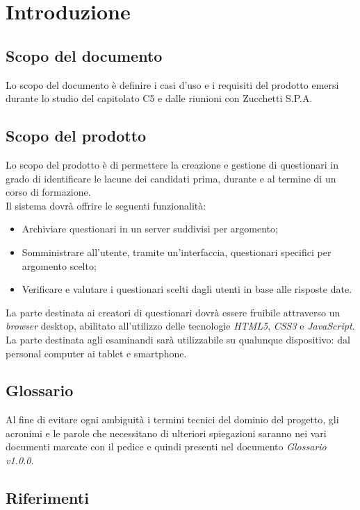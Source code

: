 \section{Introduzione}

\subsection{Scopo del documento}
Lo scopo del documento è definire i casi d'uso e i requisiti del prodotto emersi durante lo studio del capitolato C5 e dalle riunioni con Zucchetti S.P.A.
\subsection{Scopo del prodotto}
Lo scopo del prodotto è di permettere la creazione e gestione di questionari in grado di identificare le lacune dei candidati prima, durante e al termine di un corso di formazione. 
\\Il sistema dovrà offrire le seguenti funzionalità:
\begin{itemize}
\item
Archiviare questionari in un server suddivisi per argomento;
\item
Somministrare all'utente, tramite un'interfaccia, questionari specifici per argomento scelto;
\item
Verificare e valutare i questionari scelti dagli utenti in base alle risposte date.
\end{itemize}
La parte destinata ai creatori di questionari dovrà essere fruibile attraverso un \textit{browser} desktop, abilitato all'utilizzo delle tecnologie \textit{HTML5}, \textit{CSS3} e \textit{JavaScript}. La parte destinata agli esaminandi sarà utilizzabile su qualunque dispositivo: dal personal computer ai tablet e smartphone.

\subsection{Glossario}
Al fine di evitare ogni ambiguità i termini tecnici del dominio del progetto, gli acronimi e le parole che necessitano di ulteriori spiegazioni saranno nei vari documenti marcate con il pedice  e quindi presenti nel documento \textit{Glossario v1.0.0}.

\subsection{Riferimenti}

